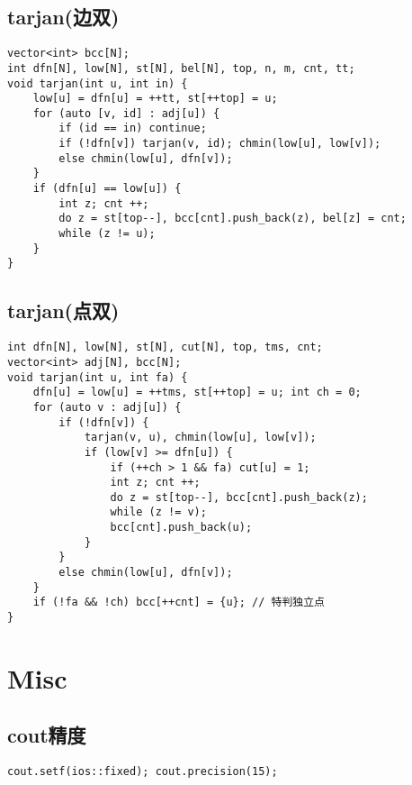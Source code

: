 \documentclass[a4paper,landscape,twocolumn]{ctexart}
\begin{document}
\subsection{tarjan(边双)}

\begin{lstlisting}
vector<int> bcc[N];
int dfn[N], low[N], st[N], bel[N], top, n, m, cnt, tt;
void tarjan(int u, int in) {
	low[u] = dfn[u] = ++tt, st[++top] = u;
	for (auto [v, id] : adj[u]) {
		if (id == in) continue;
		if (!dfn[v]) tarjan(v, id); chmin(low[u], low[v]);
		else chmin(low[u], dfn[v]);
	}
	if (dfn[u] == low[u]) {
		int z; cnt ++;
		do z = st[top--], bcc[cnt].push_back(z), bel[z] = cnt;
		while (z != u);
	}
}
\end{lstlisting}

\subsection{tarjan(点双)}

\begin{lstlisting}
int dfn[N], low[N], st[N], cut[N], top, tms, cnt;
vector<int> adj[N], bcc[N];
void tarjan(int u, int fa) {
	dfn[u] = low[u] = ++tms, st[++top] = u; int ch = 0;
	for (auto v : adj[u]) {
		if (!dfn[v]) {
			tarjan(v, u), chmin(low[u], low[v]);
			if (low[v] >= dfn[u]) {
				if (++ch > 1 && fa) cut[u] = 1;
				int z; cnt ++;
				do z = st[top--], bcc[cnt].push_back(z);
				while (z != v);
				bcc[cnt].push_back(u);
			}
		}
		else chmin(low[u], dfn[v]);
	}
	if (!fa && !ch) bcc[++cnt] = {u}; // 特判独立点
}
\end{lstlisting}

\section{Misc}

\subsection{cout精度}

\begin{lstlisting}
cout.setf(ios::fixed); cout.precision(15);
\end{lstlisting}

%
\end{document}
